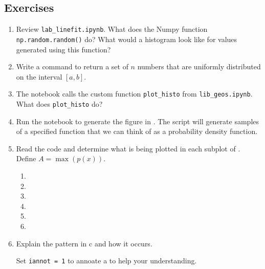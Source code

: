 \documentclass[11pt,titlepage,fleqn]{article}
\begin{document}


\pagebreak
\subsection*{Exercises}

\begin{enumerate}
\item Review \verb+lab_linefit.ipynb+. What does the Numpy function \verb+np.random.random()+ do? What would a histogram look like for values generated using this function?

\vertgap

\item Write a command to return a set of $n$ numbers that are uniformly distributed on the interval $[a,b]$.

\vertgap

\item The notebook calls the custom function \verb+plot_histo+ from \verb+lib_geos.ipynb+. What does \verb+plot_histo+ do?

\vertgap

\item Run the notebook to generate the figure in . The script will generate samples of a specified function that we can think of as a probability density function.

\item Read the code and determine what is being plotted in each subplot of . \\
Define $A = \max(p(x))$.
%
\begin{spacing}{2.0}
\begin{enumerate}
\item 
\item 
\item 
\item 
\item 
\item 
\end{enumerate}
\end{spacing}

\item Explain the pattern in c and how it occurs. 

Set \verb+iannot = 1+ to annoate a to help your understanding.


\end{enumerate}
\end{document}
